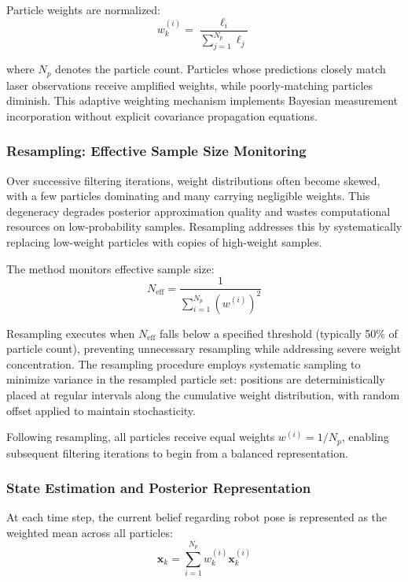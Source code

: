 \documentclass[conference]{IEEEtran}
\begin{document}
Particle weights are normalized:
\begin{equation}
    w^{(i)}_k = \frac{\ell_i}{\sum_{j=1}^{N_p} \ell_j}
\end{equation}

where $N_p$ denotes the particle count. Particles whose predictions closely match laser observations receive amplified weights, while poorly-matching particles diminish. This adaptive weighting mechanism implements Bayesian measurement incorporation without explicit covariance propagation equations.

\subsubsection{Resampling: Effective Sample Size Monitoring}

Over successive filtering iterations, weight distributions often become skewed, with a few particles dominating and many carrying negligible weights. This degeneracy degrades posterior approximation quality and wastes computational resources on low-probability samples. Resampling addresses this by systematically replacing low-weight particles with copies of high-weight samples.

The method monitors effective sample size:
\begin{equation}
    N_{\text{eff}} = \frac{1}{\sum_{i=1}^{N_p} (w^{(i)})^2}
\end{equation}

Resampling executes when $N_{\text{eff}}$ falls below a specified threshold (typically 50\% of particle count), preventing unnecessary resampling while addressing severe weight concentration. The resampling procedure employs systematic sampling to minimize variance in the resampled particle set: positions are deterministically placed at regular intervals along the cumulative weight distribution, with random offset applied to maintain stochasticity.

Following resampling, all particles receive equal weights $w^{(i)} = 1/N_p$, enabling subsequent filtering iterations to begin from a balanced representation.

\subsubsection{State Estimation and Posterior Representation}

At each time step, the current belief regarding robot pose is represented as the weighted mean across all particles:
\begin{equation}
    \mathbf{x}_k = \sum_{i=1}^{N_p} w^{(i)}_k \mathbf{x}^{(i)}_k
\end{equation}
\end{document}
